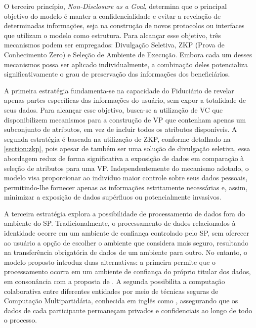 O terceiro princípio, \emph{Non-Disclosure as a Goal}, determina que o principal objetivo do modelo é manter a confidencialidade e evitar a revelação de determinadas informações, seja na construção de novos protocolos ou interfaces que utilizam o modelo como estrutura. Para alcançar esse objetivo, três mecanismos podem ser empregados: Divulgação Seletiva, \acs{ZKP} (Prova de Conhecimento Zero) e Seleção de Ambiente de Execução. Embora cada um desses mecanismos possa ser aplicado individualmente, a combinação deles potencializa significativamente o grau de preservação das informações dos beneficiários.

A primeira estratégia fundamenta-se na capacidade do Fiduciário de revelar apenas partes específicas das informações do usuário, sem expor a totalidade de seus dados. Para alcançar esse objetivo, busca-se a utilização de \acs{VC} que disponibilizem mecanismos para a construção de \acs{VP} que contenham apenas um subconjunto de atributos, em vez de incluir todos os atributos disponíveis. A segunda estratégia é baseada na utilização de  \acs{ZKP}, conforme detalhado na \autoref{section:zkp}, pois apesar de também ser uma solução de divulgação seletiva, essa abordagem reduz de forma significativa a exposição de dados em comparação à seleção de atributos para uma \acs{VP}. Independentemente do mecanismo adotado, o modelo visa proporcionar ao indivíduo maior controle sobre seus dados pessoais, permitindo-lhe fornecer apenas as informações estritamente necessárias e, assim, minimizar a exposição de dados supérfluos ou potencialmente invasivos.

A terceira estratégia explora a possibilidade de processamento de dados fora do ambiente do \acs{SP}. Tradicionalmente, o processamento de dados relacionados à identidade ocorre em um ambiente de confiança controlado pelo \acs{SP}, sem oferecer ao usuário a opção de escolher o ambiente que considera mais seguro, resultando na transferência obrigatória de dados de um ambiente para outro. No entanto, o modelo proposto introduz duas alternativas: a primeira permite que o processamento ocorra em um ambiente de confiança do próprio titular dos dados, em consonância com a proposta de . A segunda possibilita a computação colaborativa entre diferentes entidades por meio de técnicas seguras de Computação Multipartidária, conhecida em inglês como , assegurando que os dados de cada participante permaneçam privados e confidenciais ao longo de todo o processo. 





